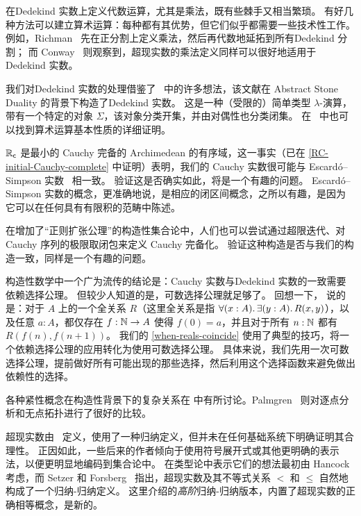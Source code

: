 %

\sectionNotes

在Dedekind 实数上定义代数运算，尤其是乘法，既有些棘手又相当繁琐。
有好几种方法可以建立算术运算：每种都有其优势，但它们似乎都需要一些技术性工作。
例如，Richman~\cite{Richman:reals} 先在正分割上定义乘法，然后再代数地延拓到所有Dedekind 分割；
而 Conway~\cite{conway:onag} 则观察到，超现实数的乘法定义同样可以很好地适用于Dedekind 实数。

我们对Dedekind 实数的处理借鉴了~\cite{BauerTaylor09} 中的许多想法，该文献在 Abstract Stone Duality 的背景下构造了Dedekind 实数。
%
这是一种（受限的）简单类型 $\lambda$-演算，带有一个特定的对象 $\Sigma$，该对象分类开集，并由对偶性也分类闭集。
在~\cite{BauerTaylor09} 中也可以找到算术运算基本性质的详细证明。

$\mathbb{R}_\mathsf{c}$ 是最小的 Cauchy 完备的 Archimedean 的有序域，这一事实（已在 \cref{RC-initial-Cauchy-complete} 中证明）表明，我们的 Cauchy 实数很可能与 Escard{\'o}--Simpson 实数~\cite{EscardoSimpson:01} 相一致。
%
验证这是否确实如此，将是一个有趣的问题。
Escard{\'o}--Simpson 实数的概念，更准确地说，是相应的闭区间概念，之所以有趣，是因为它可以在任何具有有限积的范畴中陈述。

在增加了``正则扩张公理''的构造性集合论中，人们也可以尝试通过超限迭代、对 Cauchy 序列的极限取闭包来定义 Cauchy 完备化。
验证这种构造是否与我们的构造一致，同样是一个有趣的问题。

构造性数学中一个广为流传的结论是：Cauchy 实数与Dedekind 实数的一致需要依赖选择公理。
但较少人知道的是，可数选择公理就足够了。
回想一下，
%
%
%
说的是：对于 $A$ 上的一个全关系 $R$（这里全关系是指 $\fall{x : A} \exis{y : A} R(x,y)$），以及任意 $a : A$，都仅存在 $f : \mathbb{N} \to A$ 使得 $f(0) = a$，并且对于所有 $n : \mathbb{N}$ 都有 $R(f(n), f(n+1))$。
我们的 \cref{when-reals-coincide} 使用了典型的技巧，将一个依赖选择公理的应用转化为使用可数选择公理。
具体来说，我们先用一次可数选择公理，提前做好所有可能出现的那些选择，然后利用这个选择函数来避免做出依赖性的选择。

各种紧性概念在构造性背景下的复杂关系在 \cite{bridges2002compactness} 中有所讨论。Palmgren~\cite{Palmgren:FT} 则对逐点分析和无点拓扑进行了很好的比较。

超现实数由~\cite{conway:onag} 定义，使用了一种归纳定义，但并未在任何基础系统下明确证明其合理性。
正因如此，一些后来的作者倾向于使用符号展开式或其他更明确的表示法，以便更明显地编码到集合论中。
在类型论中表示它们的想法最初由 Hancock 考虑，而 Setzer 和 Forsberg~\cite{forsbergfinite} 指出，超现实数及其不等式关系 $<$ 和 $\le$ 自然地构成了一个归纳-归纳定义。
这里介绍的\emph{高阶}归纳-归纳版本，内置了超现实数的正确相等概念，是新的。

